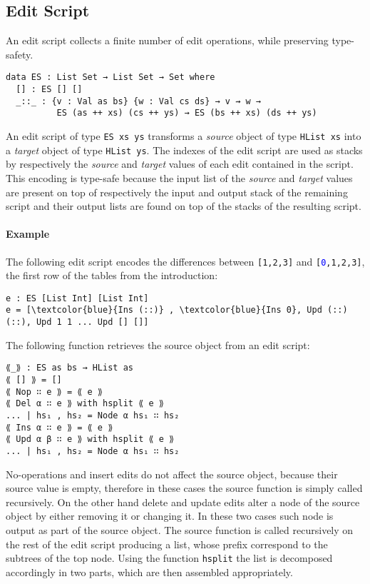 \documentclass[preprint]{sigplanconf}
\begin{document}
	\subsection{Edit Script}
        \label{subsec:edit-script}
	An edit script collects a finite number of edit operations, 
	while preserving type-safety. 
\begin{verbatim}
data ES : List Set → List Set → Set where
  [] : ES [] []
  _::_ : {v : Val as bs} {w : Val cs ds} → v ⇝ w → 
          ES (as ++ xs) (cs ++ ys) → ES (bs ++ xs) (ds ++ ys)
\end{verbatim}	
	An edit script of type \texttt{ES xs ys} transforms
	a \emph{source} object of type \texttt{HList xs} into
	a \emph{target} object of type \texttt{HList ys}. 
        The indexes of the edit script are used as stacks by respectively the 
        \emph{source} and \emph{target} values of each edit contained in the script.
        This encoding is type-safe because the input list of the \emph{source} and 
        \emph{target} values are present on top of respectively the input and output 
        stack of the remaining script and their output lists are 
        found on top of the stacks of the resulting script.

        \paragraph{Example}
        The following edit script encodes the differences between \texttt{[1,2,3]} 
        and \texttt{[\textcolor{blue}{0},1,2,3]}, the first row of the tables 
        from the introduction:

\begin{Verbatim}[commandchars=\\\{\}]
e : ES [List Int] [List Int]
e = [\textcolor{blue}{Ins (::)} , \textcolor{blue}{Ins 0}, Upd (::) (::), Upd 1 1 ... Upd [] []]
\end{Verbatim}

	The following function retrieves the source object from an edit 
        script:			
\begin{verbatim}
⟪_⟫ : ES as bs → HList as
⟪ [] ⟫ = []
⟪ Nop ∷ e ⟫ = ⟪ e ⟫
⟪ Del α ∷ e ⟫ with hsplit ⟪ e ⟫
... | hs₁ , hs₂ = Node α hs₁ ∷ hs₂
⟪ Ins α ∷ e ⟫ = ⟪ e ⟫
⟪ Upd α β ∷ e ⟫ with hsplit ⟪ e ⟫
... | hs₁ , hs₂ = Node α hs₁ ∷ hs₂
\end{verbatim}
	No-operations and insert edits do not affect the source object,
	because their source value is empty, therefore in these cases the source 
	function is simply called recursively.
	On the other hand delete and update edits alter a node of the
	source object by either removing it or changing it.
	In these two cases such node is output as part of the source object.
	The source function is called recursively on the rest of the edit 
	script producing a list, whose prefix correspond to the subtrees of the
	top node. Using the function \texttt{hsplit} the list is decomposed 
	accordingly in two parts, which are then assembled appropriately.
	
\end{document}
